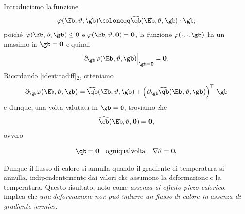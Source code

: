Introduciamo la funzione
\begin{equation}
	\varphi(\Eb, \vartheta,\gb)\coloneqq \widehat{\qb}(\Eb, \vartheta, \gb)\cdot \gb;
\end{equation}
poiché $	\varphi(\Eb, \vartheta,\gb)\leq 0$ e $	\varphi(\Eb, \vartheta, \mathbf{0})=\mathbf{0}$, la funzione $\varphi(\cdot, \cdot , \gb)$ ha un massimo in $\gb=\mathbf{0}$ e quindi
\begin{equation}
\partial_\gb \varphi(\Eb, \vartheta,\gb)\Big|_{\gb=\mathbf{0}}=\mathbf{0}.
\end{equation}
Ricordando \eqref{identitadiff}$_2$, otteniamo
\begin{equation}
\partial_\gb \varphi(\Eb, \vartheta,\gb)=\widehat{\qb}(\Eb, \vartheta, \gb)+\left( \partial_\gb \widehat{\qb}(\Eb, \vartheta,\gb)  \right)^\top\, \gb
\end{equation} 
e dunque, una volta valutata in $\gb=\mathbf{0}$, troviamo che
\begin{equation}
\widehat{\qb}(\Eb, \vartheta, \mathbf{0})=\mathbf{0},
\end{equation}
ovvero
\begin{definition}
	\begin{equation}\label{q0t}
		\qb =\mathbf{0} \quad \textrm{ogniqualvolta}\quad \nabla\vartheta=\mathbf{0}.
	\end{equation}
\end{definition}
Dunque il flusso di calore si annulla quando il gradiente di temperatura si annulla, indipendentemente dai valori che assumono la deformazione e la temperatura. Questo risultato, noto come \textit{assenza di effetto piezo-calorico}, implica che \textit{una deformazione non può indurre un flusso di calore in assenza di gradiente termico}.

